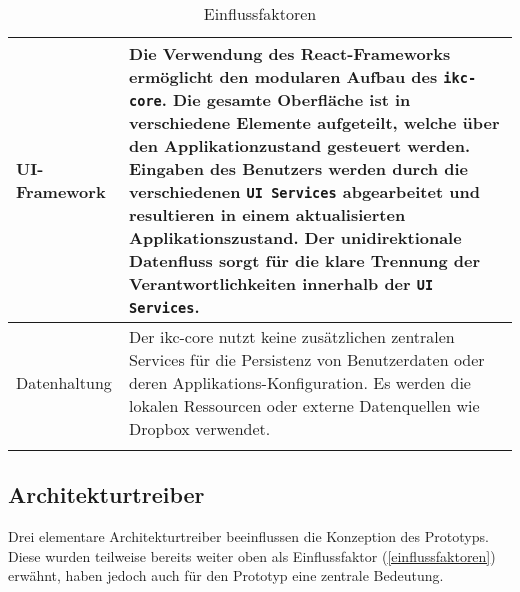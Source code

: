 \begin{longtable}{|p{4.2cm}|p{8.5cm}|}
    UI-Framework & Die Verwendung des \gls{React}-Frameworks ermöglicht den modularen Aufbau des \texttt{ikc-core}. Die gesamte Oberfläche ist in verschiedene Elemente aufgeteilt, welche über den Applikationzustand gesteuert werden. Eingaben des Benutzers werden durch die verschiedenen \texttt{UI Services} abgearbeitet und resultieren in einem aktualisierten Applikationszustand. Der unidirektionale Datenfluss sorgt für die klare Trennung der Verantwortlichkeiten innerhalb der \texttt{UI Services}. \\\hline
    
    Datenhaltung & Der \gls{ikc-core} nutzt keine zusätzlichen zentralen Services für die Persistenz von Benutzerdaten oder deren Applikations-Konfiguration. Es werden die lokalen Ressourcen oder externe Datenquellen wie \gls{Dropbox} verwendet. \\\hline
    \caption{Einflussfaktoren}
  \label{tab:einflussfaktoren}
\end{longtable}





\subsection{Architekturtreiber}


Drei elementare Architekturtreiber beeinflussen die Konzeption des Prototyps. Diese wurden teilweise bereits weiter oben als Einflussfaktor (\autoref{einflussfaktoren}) erwähnt, haben jedoch auch für den Prototyp eine zentrale Bedeutung.

